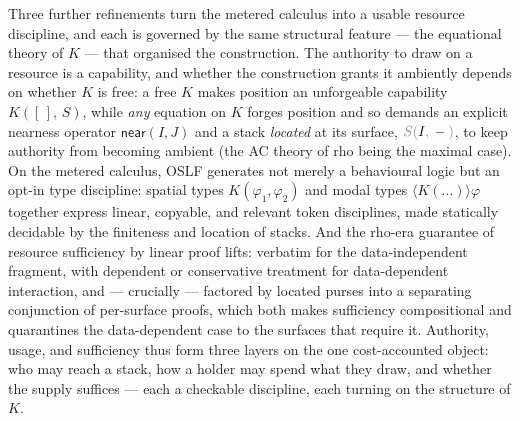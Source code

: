 \documentclass[11pt]{article}
\theoremstyle{definition}
\theoremstyle{plain}
\newcommand{\dec}[1]{\textcolor{costgray}{#1}}   %
\newcommand{\near}{\mathsf{near}}
\newcommand{\lstk}[2]{\dec{S(}{#1}\dec{,}\,#2\dec{)}}  %
\newcommand{\Kctx}[1]{K([\,],\, #1)}
\newcommand{\dia}[1]{\langle #1 \rangle}  %
\begin{document}
Three further refinements turn the metered calculus into a usable
resource discipline, and each is governed by the same structural feature
--- the equational theory of $K$ --- that organised the construction. The
authority to draw on a resource is a capability, and whether the
construction grants it ambiently depends on whether $K$ is free: a free
$K$ makes position an unforgeable capability $\Kctx{S}$, while \emph{any}
equation on $K$ forges position and so demands an explicit nearness
operator $\near(I,J)$ and a stack \emph{located} at its surface,
$\lstk{I}{-}$, to keep authority from becoming ambient (the AC theory of
rho being the maximal case). On the metered calculus, OSLF generates not merely a
behavioural logic but an opt-in type discipline: spatial types
$K(\varphi_1,\varphi_2)$ and modal types $\dia{K(\dots)}\varphi$ together
express linear, copyable, and relevant token disciplines, made statically
decidable by the finiteness and location of stacks. And the rho-era
guarantee of resource sufficiency by linear proof lifts: verbatim for the
data-independent fragment, with dependent or conservative treatment for
data-dependent interaction, and --- crucially --- factored by located
purses into a separating conjunction of per-surface proofs, which both
makes sufficiency compositional and quarantines the data-dependent case
to the surfaces that require it. Authority, usage, and sufficiency thus
form three layers on the one cost-accounted object: who may reach a stack,
how a holder may spend what they draw, and whether the supply suffices ---
each a checkable discipline, each turning on the structure of $K$.
\end{document}
